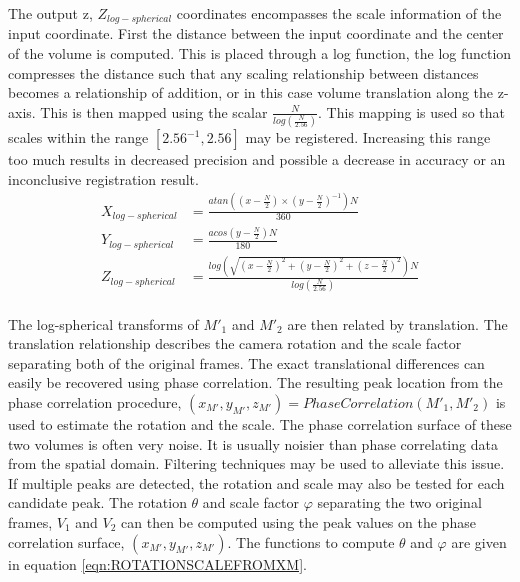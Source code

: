 The output z, $Z_{log-spherical}$ coordinates encompasses the scale information of the input coordinate. First the distance between the input coordinate and the center of the volume is computed. This is placed through a log function, the log function compresses the distance such that any scaling relationship between distances becomes a relationship of addition, or in this case volume translation along the z-axis. This is then mapped using the scalar $\frac{N}{log\left(\frac{N}{2.56}\right)}$. This mapping is used so that scales within the range $[2.56^{-1}, 2.56]$ may be registered. Increasing this range too much results in decreased precision and possible a decrease in accuracy or an inconclusive registration result. \\


\begin{equation} \label{eqn:Log_Spherical}
\begin{split}
X_{log-spherical} & = \frac{atan\left(
\left( x-\frac{N}{2} \right) \times
\left(y-\frac{N}{2}\right)^{-1}
\right)N}{360}\\
Y_{log-spherical} & = \frac{acos\left(
y-\frac{N}{2}
\right)N}
{180} \\
Z_{log-spherical} & =\frac{log\left(
\sqrt{\left(x-\frac{N}{2}\right)^2+\left(y-\frac{N}{2}\right)^2+\left(z-\frac{N}{2}\right)^2}
\right)N}{log\left( \frac{N}{2.56} \right)} \\
\end{split}
\end{equation}

The log-spherical transforms of $M'_1$ and $M'_2$ are then related by translation. The translation relationship describes the camera rotation and the scale factor separating both of the original frames. The exact translational differences can easily be recovered using phase correlation. The resulting peak location from the phase correlation procedure, $(x_{M'},y_{M'},z_{M'}) = PhaseCorrelation(M'_1, M'_2)$ is used to estimate the rotation and the scale. The phase correlation surface of these two volumes is often very noise. It is usually noisier than phase correlating data from the spatial domain. Filtering techniques may be used to alleviate this issue. If multiple peaks are detected, the rotation and scale may also be tested for each candidate peak. The rotation $\theta$ and scale factor $\varphi$ separating the two original frames, $V_1$ and $V_2$ can then be computed using the peak values on the phase correlation surface, $(x_{M'},y_{M'},z_{M'})$. The functions to compute $\theta$ and $\varphi$ are given in equation \ref{eqn:ROTATIONSCALEFROMXM}. \\
 
